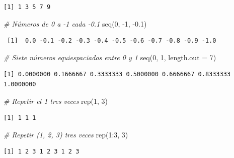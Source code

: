 \documentclass[
]{book}
\newenvironment{Shaded}{\begin{snugshade}}{\end{snugshade}}
\newcommand{\AttributeTok}[1]{\textcolor[rgb]{0.77,0.63,0.00}{#1}}
\newcommand{\CommentTok}[1]{\textcolor[rgb]{0.56,0.35,0.01}{\textit{#1}}}
\newcommand{\DecValTok}[1]{\textcolor[rgb]{0.00,0.00,0.81}{#1}}
\newcommand{\FloatTok}[1]{\textcolor[rgb]{0.00,0.00,0.81}{#1}}
\newcommand{\FunctionTok}[1]{\textcolor[rgb]{0.00,0.00,0.00}{#1}}
\newcommand{\NormalTok}[1]{#1}
\newcommand{\SpecialCharTok}[1]{\textcolor[rgb]{0.00,0.00,0.00}{#1}}
\begin{document}
\begin{verbatim}
[1] 1 3 5 7 9
\end{verbatim}

\begin{Shaded}
\begin{Highlighting}[]
\CommentTok{\# Números de 0 a {-}1 cada {-}0.1}
\FunctionTok{seq}\NormalTok{(}\DecValTok{0}\NormalTok{, }\SpecialCharTok{{-}}\DecValTok{1}\NormalTok{, }\SpecialCharTok{{-}}\FloatTok{0.1}\NormalTok{)}
\end{Highlighting}
\end{Shaded}

\begin{verbatim}
 [1]  0.0 -0.1 -0.2 -0.3 -0.4 -0.5 -0.6 -0.7 -0.8 -0.9 -1.0
\end{verbatim}

\begin{Shaded}
\begin{Highlighting}[]
\CommentTok{\# Siete números equiespaciados entre 0 y 1}
\FunctionTok{seq}\NormalTok{(}\DecValTok{0}\NormalTok{, }\DecValTok{1}\NormalTok{, }\AttributeTok{length.out =} \DecValTok{7}\NormalTok{)}
\end{Highlighting}
\end{Shaded}

\begin{verbatim}
[1] 0.0000000 0.1666667 0.3333333 0.5000000 0.6666667 0.8333333 1.0000000
\end{verbatim}

\begin{Shaded}
\begin{Highlighting}[]
\CommentTok{\# Repetir el 1 tres veces}
\FunctionTok{rep}\NormalTok{(}\DecValTok{1}\NormalTok{, }\DecValTok{3}\NormalTok{)}
\end{Highlighting}
\end{Shaded}

\begin{verbatim}
[1] 1 1 1
\end{verbatim}

\begin{Shaded}
\begin{Highlighting}[]
\CommentTok{\# Repetir (1, 2, 3) tres veces}
\FunctionTok{rep}\NormalTok{(}\DecValTok{1}\SpecialCharTok{:}\DecValTok{3}\NormalTok{, }\DecValTok{3}\NormalTok{)}
\end{Highlighting}
\end{Shaded}

\begin{verbatim}
[1] 1 2 3 1 2 3 1 2 3
\end{verbatim}
\end{document}
